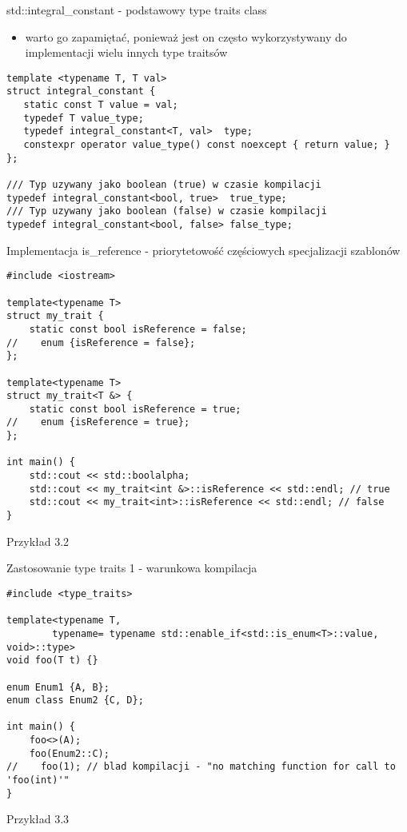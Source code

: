 \documentclass[11pt]{beamer}
\begin{document}
\begin{frame}[fragile]{std::integral\_constant - podstawowy type traits class}
    \begin{itemize}
     \item warto go zapamiętać, ponieważ jest on często wykorzystywany do implementacji wielu innych type traitsów
    \end{itemize}
    \begin{lstlisting}[frame=single]
template <typename T, T val>
struct integral_constant {
   static const T value = val;
   typedef T value_type;
   typedef integral_constant<T, val>  type;
   constexpr operator value_type() const noexcept { return value; }
};

/// Typ uzywany jako boolean (true) w czasie kompilacji
typedef integral_constant<bool, true>  true_type;
/// Typ uzywany jako boolean (false) w czasie kompilacji
typedef integral_constant<bool, false> false_type;

    \end{lstlisting}
\end{frame}

\begin{frame}[fragile]{Implementacja is\_reference - priorytetowość częściowych specjalizacji szablonów}
 \begin{lstlisting}[frame=single,basicstyle=\tiny]
#include <iostream>

template<typename T>
struct my_trait {
    static const bool isReference = false;
//    enum {isReference = false};
};

template<typename T>
struct my_trait<T &> {
    static const bool isReference = true;
//    enum {isReference = true};
};

int main() {
    std::cout << std::boolalpha;
    std::cout << my_trait<int &>::isReference << std::endl; // true
    std::cout << my_trait<int>::isReference << std::endl; // false
}
 \end{lstlisting}
\alert{Przykład 3.2}
\end{frame}

\begin{frame}[fragile]{Zastosowanie type traits 1 - warunkowa kompilacja}
 \begin{lstlisting}[frame=single,basicstyle=\tiny]
#include <type_traits>

template<typename T,
        typename= typename std::enable_if<std::is_enum<T>::value, void>::type>
void foo(T t) {}

enum Enum1 {A, B};
enum class Enum2 {C, D};

int main() {
    foo<>(A);
    foo(Enum2::C);
//    foo(1); // blad kompilacji - "no matching function for call to 'foo(int)'"
}
    \end{lstlisting}
    
    \alert{Przykład 3.3}
\end{frame}
\end{document}
